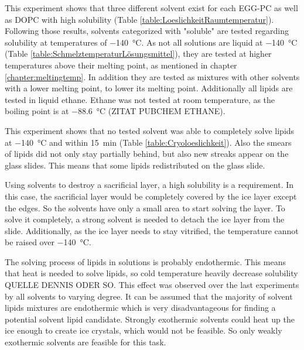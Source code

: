 This experiment shows that three different solvent exist for each EGG-PC as well as DOPC with high solubility (Table \ref{table:LoeslichkeitRaumtemperatur}). Following those results, solvents categorized with "soluble" are tested regarding solubility at temperatures of \SI{-140}{\degreeCelsius}. As not all solutions are liquid at \SI{-140}{\degreeCelsius} (Table \ref{table:SchmelztemperaturLösungsmittel}), they are tested at higher temperatures above their melting point, as mentioned in chapter \ref{chapter:meltingtemp}. In addition they are tested as mixtures with other solvents with a lower melting point, to lower its melting point. Additionally all lipids are tested in liquid ethane. Ethane was not tested at room temperature, as the boiling point is at \SI{-88.6}{\degreeCelsius} (ZITAT PUBCHEM ETHANE).

This experiment shows that no tested solvent was able to completely solve lipids at \SI{-140}{\degreeCelsius} and within \SI{15}{\minute} (Table \ref{table:Cryoloeslichkeit}). Also the smears of lipids did not only stay partially behind, but also new streaks appear on the glass slides. This means that some lipids redistributed on the glass slide.

Using solvents to destroy a sacrificial layer, a high solubility is a requirement. In this case, the sacrificial layer would be completely covered by the ice layer except the edges. So the solvents have only a small area to start solving the layer. To solve it completely, a strong solvent is needed to detach the ice layer from the slide. Additionally, as the ice layer needs to stay vitrified, the temperature cannot be raised over \SI{-140}{\degreeCelsius}. 

The solving process of lipids in solutions is probably endothermic. This means that heat is needed to solve lipids, so cold temperature heavily decrease solubility QUELLE DENNIS ODER SO. This effect was observed over the last experiments by all solvents to varying degree. It can be assumed that the majority of solvent lipids mixtures are endothermic which is very disadvantageous for finding a potential solvent lipid candidate. Strongly exothermic solvents could heat up the ice enough to create ice crystals, which would not be feasible. So only weakly exothermic solvents are feasible for this task. 

